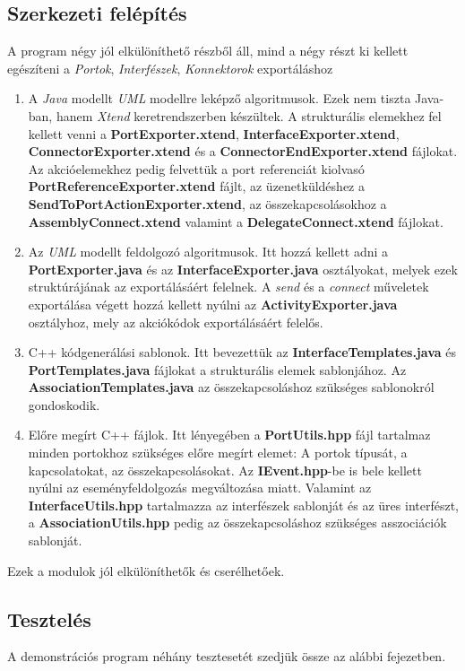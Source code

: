 \documentclass[a4paper,12pt]{report}
\begin{document}
\subsection{Szerkezeti felépítés}
A program négy jól elkülöníthető részből áll, mind a négy részt ki kellett egészíteni a \textit{Portok}, \textit{Interfészek}, \textit{Konnektorok} exportáláshoz

\begin{enumerate}
\item A \textit{Java} modellt \textit{UML} modellre leképző algoritmusok. Ezek nem tiszta Java-ban, hanem \textit{Xtend} keretrendszerben készültek. A strukturális elemekhez fel kellett venni a \textbf{PortExporter.xtend}, \textbf{InterfaceExporter.xtend}, \textbf{ConnectorExporter.xtend} és a \textbf{ConnectorEndExporter.xtend} fájlokat. Az akcióelemekhez pedig felvettük a port referenciát kiolvasó \textbf{PortReferenceExporter.xtend} fájlt, az üzenetküldéshez a \textbf{SendToPortActionExporter.xtend}, az összekapcsolásokhoz a \textbf{AssemblyConnect.xtend} valamint a \textbf{DelegateConnect.xtend} fájlokat.
\item Az \textit{UML} modellt feldolgozó algoritmusok. Itt hozzá kellett adni a  \textbf{PortExporter.java} és az \textbf{InterfaceExporter.java} osztályokat, melyek ezek struktúrájának az exportálásáért felelnek. A \textit{send} és a \textit{connect} műveletek exportálása végett hozzá kellett nyúlni az \textbf{ActivityExporter.java} osztályhoz, mely az akciókódok exportálásáért felelős.
\item C++ kódgenerálási sablonok. Itt bevezettük az \textbf{InterfaceTemplates.java} és \textbf{PortTemplates.java} fájlokat a strukturális elemek sablonjához. Az \textbf{AssociationTemplates.java} az összekapcsoláshoz szükséges sablonokról gondoskodik.
\item Előre megírt C++ fájlok. Itt lényegében a \textbf{PortUtils.hpp} fájl tartalmaz minden portokhoz szükséges előre megírt elemet: A portok típusát, a kapcsolatokat, az összekapcsolásokat. Az \textbf{IEvent.hpp}-be is bele kellett nyúlni az eseményfeldolgozás megváltozása miatt. Valamint az \textbf{InterfaceUtils.hpp} tartalmazza az interfészek sablonját és az üres interfészt, a \textbf{AssociationUtils.hpp} pedig az összekapcsoláshoz szükséges asszociációk sablonját.
\end{enumerate}

Ezek a modulok jól elkülöníthetők és cserélhetőek. 

\subsection{Tesztelés}
A demonstrációs program néhány tesztesetét szedjük össze az alábbi fejezetben.
\end{document}
